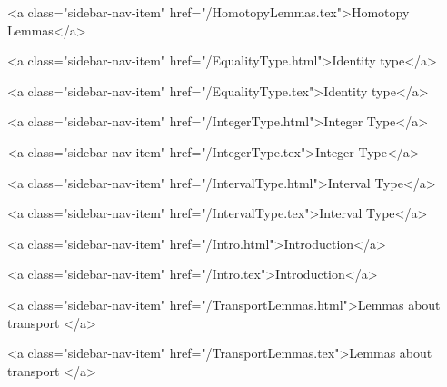       
        
          <a class="sidebar-nav-item" href="/HomotopyLemmas.tex">Homotopy Lemmas</a>
        
      
    
      
        
          <a class="sidebar-nav-item" href="/EqualityType.html">Identity type</a>
        
      
    
      
        
          <a class="sidebar-nav-item" href="/EqualityType.tex">Identity type</a>
        
      
    
      
        
          <a class="sidebar-nav-item" href="/IntegerType.html">Integer Type</a>
        
      
    
      
        
          <a class="sidebar-nav-item" href="/IntegerType.tex">Integer Type</a>
        
      
    
      
        
          <a class="sidebar-nav-item" href="/IntervalType.html">Interval Type</a>
        
      
    
      
        
          <a class="sidebar-nav-item" href="/IntervalType.tex">Interval Type</a>
        
      
    
      
        
          <a class="sidebar-nav-item" href="/Intro.html">Introduction</a>
        
      
    
      
        
          <a class="sidebar-nav-item" href="/Intro.tex">Introduction</a>
        
      
    
      
        
          <a class="sidebar-nav-item" href="/TransportLemmas.html">Lemmas about transport </a>
        
      
    
      
        
          <a class="sidebar-nav-item" href="/TransportLemmas.tex">Lemmas about transport </a>
        
      
    
